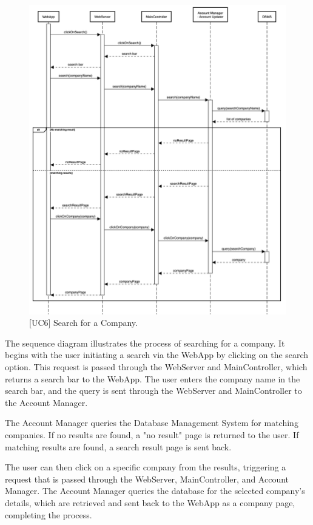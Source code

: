 \begin{figure}[htbp]
    \centering
    \includegraphics[width=\linewidth]{DD/Images/sequenceDiagrams/SearchCompany.png}
    \caption{[UC6] Search for a Company.}
    \label{fig:searchCompany_immagine}
\end{figure}
\clearpage

The sequence diagram illustrates the process of searching for a company. It begins with the user initiating a search via the WebApp by clicking on the search option. This request is passed through the WebServer and MainController, which returns a search bar to the WebApp. The user enters the company name in the search bar, and the query is sent through the WebServer and MainController to the Account Manager.

The Account Manager queries the Database Management System for matching companies. If no results are found, a "no result" page is returned to the user. If matching results are found, a search result page is sent back.

The user can then click on a specific company from the results, triggering a request that is passed through the WebServer, MainController, and Account Manager. The Account Manager queries the database for the selected company's details, which are retrieved and sent back to the WebApp as a company page, completing the process.

